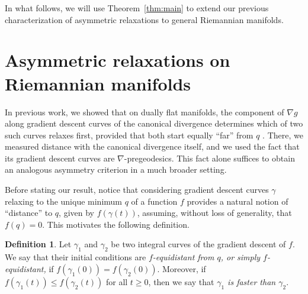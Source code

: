 \documentclass{amsart}
\theoremstyle{definition}
\newtheorem{definition}[theorem]{Definition}
\begin{document}
In what follows, we will use Theorem~\ref{thm:main}
to extend our previous characterization of asymmetric relaxations \cite{bravetti_asymmetric_2025} to general Riemannian manifolds.

\section{Asymmetric relaxations on Riemannian manifolds}\label{sec:asymmetricrelaxations}

In previous work, we showed that on dually flat manifolds, the component of $\nabla g$ along gradient descent curves of the canonical divergence determines which of two such curves relaxes first, provided that both start equally ``far'' from $q$ \cite{bravetti_asymmetric_2025}. There, we measured distance with the canonical divergence itself, and we used the fact that its gradient descent curves are $\nabla$-pregeodesics. This fact alone suffices to obtain an analogous asymmetry criterion in a much broader setting.

Before stating our result, notice that considering gradient descent curves $\gamma$ 
relaxing to the unique minimum $q$ of a function $f$ provides a natural notion of ``distance'' to $q$, given by $f(\gamma(t))$,  
assuming, without loss of generality, that $f(q)=0$.
This motivates the following definition.

    \begin{definition}\label{def:fequidistant}
       Let $\gamma_1$ and $\gamma_2$ be two integral curves of the gradient descent of $f$.   
       We say that their initial conditions are \emph{$f$-equidistant from $q$, or simply $f$-equidistant,} 
       if $f(\gamma_1(0))=f(\gamma_2(0))$. 
       Moreover, if $f(\gamma_1(t))\leq f(\gamma_2(t))$ for all $t\geq 0$, then we say that \emph{$\gamma_1$ is faster than $\gamma_2$}.
    \end{definition}
\end{document}
